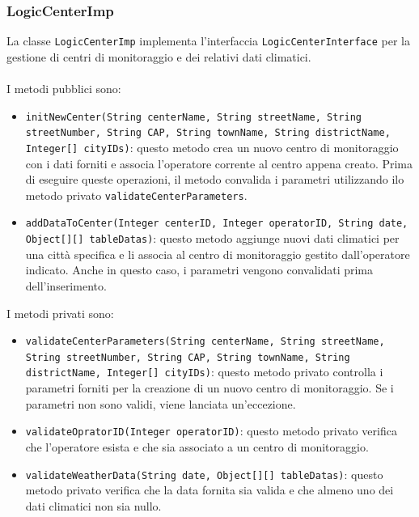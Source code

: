 \subsubsection{LogicCenterImp}
La classe \texttt{LogicCenterImp} implementa l'interfaccia \texttt{LogicCenterInterface} per la gestione di centri di monitoraggio e dei relativi dati climatici.\\
\\
I metodi pubblici sono:
\begin{itemize}
    \item \texttt{initNewCenter(String centerName, String streetName, String streetNumber, String CAP, String townName, String districtName, Integer[] cityIDs)}:
          questo metodo crea un nuovo centro di monitoraggio con i dati forniti e associa l'operatore corrente al centro appena creato.
          Prima di eseguire queste operazioni, il metodo convalida i parametri utilizzando ilo metodo privato \texttt{validateCenterParameters}.
    \item \texttt{addDataToCenter(Integer centerID, Integer operatorID, String date, Object[][] tableDatas)}:
          questo metodo aggiunge nuovi dati climatici per una città specifica e li associa al centro di monitoraggio gestito dall'operatore indicato.
          Anche in questo caso, i parametri vengono convalidati prima dell'inserimento.
\end{itemize}
I metodi privati sono:
\begin{itemize}
    \item \texttt{validateCenterParameters(String centerName, String streetName, String streetNumber, String CAP, String townName, String districtName, Integer[] cityIDs)}:
          questo metodo privato controlla i parametri forniti per la creazione di un nuovo centro di monitoraggio. Se i parametri non sono validi, viene lanciata un'eccezione.
    \item \texttt{validateOpratorID(Integer operatorID)}:
          questo metodo privato verifica che l'operatore esista e che sia associato a un centro di monitoraggio.
    \item \texttt{validateWeatherData(String date, Object[][] tableDatas)}:
          questo metodo privato verifica che la data fornita sia valida e che almeno uno dei dati climatici non sia nullo.
\end{itemize}

